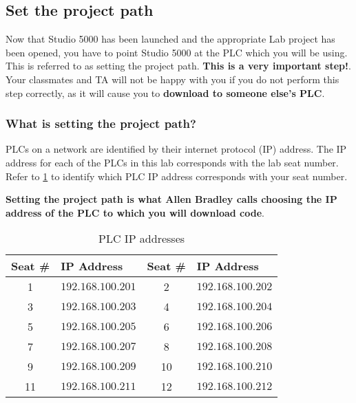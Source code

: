 \subsection{Set the project path}

Now that Studio 5000 has been launched and the appropriate Lab project has been opened, you have to point Studio 5000 at the PLC which you will be using. This is referred to as setting the project path. \textbf{This is a very important step!}. Your classmates and TA will not be happy with you if you do not perform this step correctly, as it will cause you to \textbf{download to someone else's PLC}. 


\subsubsection{What is setting the project path?}
PLCs on a network are identified by their internet protocol (IP) address. The IP address for each of the PLCs in this lab corresponds with the lab seat number. Refer to \tableautorefname \ref{Table:PLCIpAddresses} to identify which PLC IP address corresponds with your seat number.

\textbf{Setting the project path is what Allen Bradley calls choosing the IP address of the PLC to which you will download code}.

\begin{table}[h]
\centering
\caption{PLC IP addresses}
\label{Table:PLCIpAddresses}
\begin{tabular}{c l | c l}
\toprule
Seat \# & IP Address & Seat \# & IP Address\\
\midrule
1 & $192.168.100.201$ & 2 & $192.168.100.202$ \\
3 & $192.168.100.203$ & 4 & $192.168.100.204$ \\
5 & $192.168.100.205$ & 6 & $192.168.100.206$ \\
7 & $192.168.100.207$ & 8 & $192.168.100.208$ \\
9 & $192.168.100.209$ & 10 & $192.168.100.210$ \\
11 & $192.168.100.211$ & 12 & $192.168.100.212$ \\
\bottomrule
\end{tabular}
\end{table}

